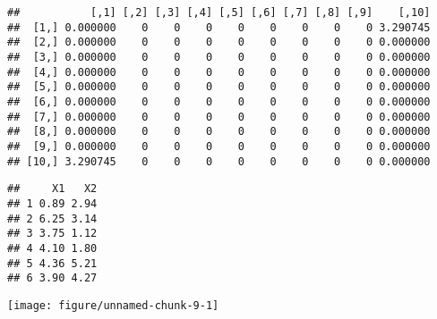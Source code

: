 \documentclass[12pt]{report}\usepackage[]{graphicx}\usepackage[dvipsnames]{xcolor}
\makeatletter
\def\maxwidth{ %
  \ifdim\Gin@nat@width>\linewidth
    \linewidth
  \else
    \Gin@nat@width
  \fi
}
\newenvironment{kframe}{%
 \def\at@end@of@kframe{}%
 \ifinner\ifhmode%
  \def\at@end@of@kframe{\end{minipage}}%
  \begin{minipage}{\columnwidth}%
 \fi\fi%
 \def\FrameCommand##1{\hskip\@totalleftmargin \hskip-\fboxsep
 \colorbox{shadecolor}{##1}\hskip-\fboxsep
     \hskip-\linewidth \hskip-\@totalleftmargin \hskip\columnwidth}%
 \MakeFramed {\advance\hsize-\width
   \@totalleftmargin\z@ \linewidth\hsize
   \@setminipage}}%
 {\par\unskip\endMakeFramed%
 \at@end@of@kframe}
\newenvironment{knitrout}{}{} %
\makeatother
\begin{document}
\begin{knitrout}
\begin{kframe}
{\ttfamily\noindent\itshape\color{messagecolor}{\#\# \\\#\# \ Matrix Distance (distance type = EUC, approach type = MIN):}}\begin{verbatim}
##           [,1] [,2] [,3] [,4] [,5] [,6] [,7] [,8] [,9]    [,10]
##  [1,] 0.000000    0    0    0    0    0    0    0    0 3.290745
##  [2,] 0.000000    0    0    0    0    0    0    0    0 0.000000
##  [3,] 0.000000    0    0    0    0    0    0    0    0 0.000000
##  [4,] 0.000000    0    0    0    0    0    0    0    0 0.000000
##  [5,] 0.000000    0    0    0    0    0    0    0    0 0.000000
##  [6,] 0.000000    0    0    0    0    0    0    0    0 0.000000
##  [7,] 0.000000    0    0    0    0    0    0    0    0 0.000000
##  [8,] 0.000000    0    0    0    0    0    0    0    0 0.000000
##  [9,] 0.000000    0    0    0    0    0    0    0    0 0.000000
## [10,] 3.290745    0    0    0    0    0    0    0    0 0.000000
\end{verbatim}


{\ttfamily\noindent\itshape\color{messagecolor}{\#\# \\\#\# \ The minimum distance is: 3.29074459659208}}

{\ttfamily\noindent\itshape\color{messagecolor}{\#\# \\\#\# \ The closest clusters are: 1, 10}}

{\ttfamily\noindent\itshape\color{messagecolor}{\#\# \\\#\# \ The grouped clusters are added to the solution.}}

{\ttfamily\noindent\itshape\color{messagecolor}{\#\# \\\#\# \ Grouping clusters 1 and cluster 10, it is created a new cluster:}}\begin{verbatim}
##     X1   X2
## 1 0.89 2.94
## 2 6.25 3.14
## 3 3.75 1.12
## 4 4.10 1.80
## 5 4.36 5.21
## 6 3.90 4.27
\end{verbatim}


{\ttfamily\noindent\itshape\color{messagecolor}{\#\# \\\#\# \ The new cluster is added to the solution.}}

{\ttfamily\noindent\itshape\color{messagecolor}{\#\# \\\#\# \ This loop has been repeated until the last cluster contained every single clusters.}}\end{kframe}
\texttt{[image: figure/unnamed-chunk-9-1]} 
\end{knitrout}
	
\end{document}
